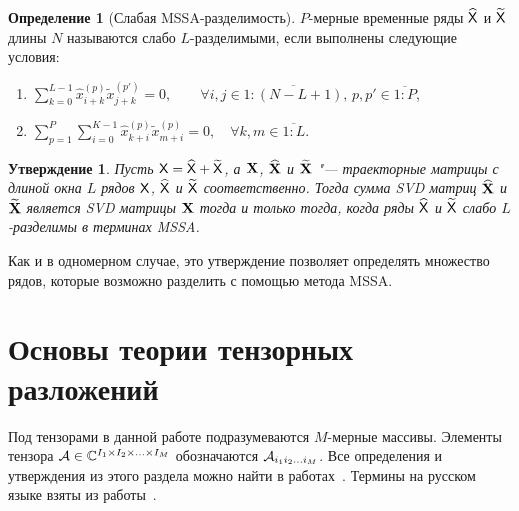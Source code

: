 \documentclass[specialist,
    substylefile = spbu.rtx,
    subf,href,colorlinks=true, 12pt]{disser}
\theoremstyle{plain}
\newtheorem{statement}{Утверждение}[section]
\theoremstyle{definition}
\newtheorem{definition}{Определение}[section]
\theoremstyle{remark}
\begin{document}
    \begin{definition}[Слабая MSSA-разделимость]
        \label{def:mssa-separability}
        $P$-мерные временные ряды $\widehat{\mathsf{X}}$ и $\widetilde{\mathsf{X}}$ длины $N$ называются слабо $L$-разделимыми, если
        выполнены следующие условия:
        \begin{enumerate}
            \item $\displaystyle \sum_{k=0}^{L-1} \hat{x}_{i+k}^{(p)}\tilde{x}_{j+k}^{(p')} = 0,
            \qquad \forall i, j \in \overline{1:(N-L+1)},\, p, p' \in \overline{1:P}$,
            \item $\displaystyle \sum_{p=1}^{P} \sum_{i=0}^{K-1} \hat{x}_{k+i}^{(p)} \tilde{x}_{m+i}^{(p)} = 0, \quad
            \forall k, m \in \overline{1:L}$.
        \end{enumerate}
    \end{definition}

    \begin{statement}
        \label{state:mssa-separability}
        Пусть $\mathsf{X} = \widehat{\mathsf{X}} + \widetilde{\mathsf{X}}$, а $\mathbf{X}$, $\widehat{\mathbf{X}}$ и $\widetilde{\mathbf{X}}$ "--- траекторные
        матрицы с длиной окна $L$ рядов $\mathsf{X}$, $\widehat{\mathsf{X}}$ и $\widetilde{\mathsf{X}}$ соответственно.
        Тогда сумма \emph{SVD} матриц $\widehat{\mathbf{X}}$ и $\widetilde{\mathbf{X}}$ является \emph{SVD} матрицы $\mathbf{X}$ тогда и только тогда, когда
        ряды $\widehat{\mathsf{X}}$ и $\widetilde{\mathsf{X}}$ слабо $L$-разделимы в терминах MSSA.
    \end{statement}
    Как и в одномерном случае, это утверждение позволяет определять множество рядов, которые возможно разделить с
    помощью метода MSSA.


    \section{Основы теории тензорных разложений}\label{sec:tensor-decompositions}
    Под тензорами в данной работе подразумеваются $M$-мерные массивы.
    Элементы тензора $\mathcal{A} \in \mathbb{C}^{I_1 \times I_2 \times \ldots \times I_M}$ обозначаются
    $\mathcal{A}_{i_1 i_2 \ldots i_M}$.
    Все определения и утверждения из этого раздела можно найти в 
    работах~\cite{hosvd, tensor-bg, tensor-bg2, tensor-bg3}.
    Термины на русском языке взяты из работы~\cite{tensor-rus}.
\end{document}
